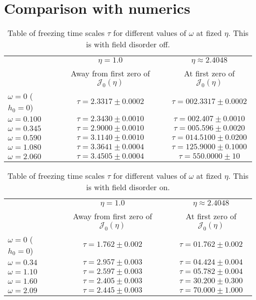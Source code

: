 \documentclass[a4paper,10pt]{article}
\begin{document}
\section{\sc Comparison with numerics}
\label{sec:comparisons}
\begin{table*}
\caption{\label{tab:fdoff} Table of freezing time scales $\tau$ for different values of $\omega$ at fized $\eta$. This is with field disorder off.}
\begin{tabular}{@{}|l||cc|cc|}
\hline
  & & $\eta = 1.0$ & & $\eta \approx 2.4048$   \\
 &&  Away from first zero of  $\mathcal{J}_0(\eta)$ &&  At first zero of $\mathcal{J}_0(\eta)$\\
\hline 
\hline
$\omega = 0$ ($h_0=0$) &&  $\tau = 2.3317  \pm 0.0002$&&$\tau = 002.3317 \pm 0.0002$  \\
\hline
$\omega = 0.100$ && $\tau = 2.3430 \pm 0.0010$ && $\tau = 002.407 \pm 0.0010$ \\
\hline
$\omega = 0.345$ && $\tau = 2.9000 \pm 0.0010$ && $\tau = 005.596\pm 0.0020$ \\
\hline
$\omega = 0.590$ && $\tau = 3.1140 \pm 0.0010$ && $\tau = 014.5100 \pm 0.0200$ \\ 
\hline
$\omega = 1.080$ && $\tau = 3.3641 \pm 0.0004$ && $\tau = 125.9000 \pm 0.1000 $\\
\hline
$\omega = 2.060$ && $\tau = 3.4505 \pm 0.0004 $ && $\tau = 550.0000 \pm 10  $ \\ 
\hline
\end{tabular}
\end{table*}
\begin{table*}
\caption{\label{tab:fdon} Table of freezing time scales $\tau$ for different values of $\omega$ at fized $\eta$. This is with field disorder on.}
\begin{tabular}{@{}|l||cc|cc|}
\hline
  & & $\eta = 1.0$ & & $\eta \approx 2.4048$   \\
 &&  Away from first zero of  $\mathcal{J}_0(\eta)$ &&  At first zero of $\mathcal{J}_0(\eta)$\\
\hline 
\hline
$\omega = 0$ ($h_0=0$) &&  $\tau = 1.762 \pm 0.002$&&$\tau = 01.762 \pm 0.002$  \\
\hline
$\omega = 0.34$ && $\tau = 2.957 \pm 0.003$ && $\tau = 04.424 \pm 0.004$ \\
\hline 
$\omega = 1.10$ && $\tau = 2.597 \pm 0.003$ && $\tau = 05.782 \pm  0.004$\\
\hline
$\omega = 1.60$ && $\tau = 2.405 \pm 0.003$ && $\tau = 30.200\pm 0.300 $ \\ 
\hline
$\omega = 2.09$ && $\tau = 2.445 \pm 0.003$ && $\tau = 70.000 \pm 1.000$ \\
\hline
\end{tabular}
\end{table*}
\end{document}
